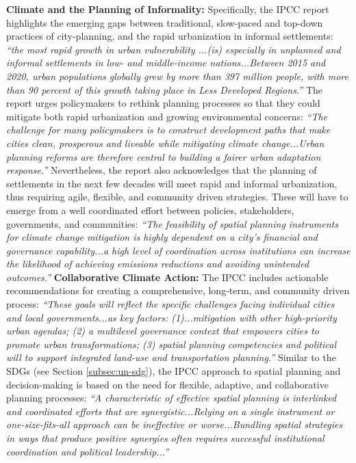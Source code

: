{{{            \textbf{Climate and the Planning of Informality:} Specifically, the IPCC report highlights the emerging gaps between traditional, slow-paced and top-down practices of city-planning, and the rapid urbanization in informal settlements: \textit{``the most rapid growth in urban vulnerability ...(is) especially in unplanned and informal settlements in low- and middle-income nations...Between 2015 and 2020, urban populations globally grew by more than 397 million people, with more than 90 percent of this growth taking place in Less Developed Regions.''}\cite{IPCC_AR6_22} The report urges policymakers to rethink planning processes so that they could mitigate both rapid urbanization and growing environmental concerns: \textit{``The challenge for many policymakers is to construct development paths that make cities clean, prosperous and liveable while mitigating climate change...Urban planning reforms are therefore central to building a fairer urban adaptation response.''}\cite{IPCC_AR6_22} Nevertheless, the report also acknowledges that the planning of settlements in the next few decades will meet rapid and informal urbanization, thus requiring agile, flexible, and community driven strategies. These will have to emerge from a well coordinated effort between policies, stakeholders, governments, and communities: \textit{``The feasibility of spatial planning instruments for climate change mitigation is highly dependent on a city's financial and governance capability...a high level of coordination across institutions can increase the likelihood of achieving emissions reductions and avoiding unintended outcomes.''} \cite{shukla2019ipcc}
            \newline
            \textbf{Collaborative Climate Action:} The IPCC includes actionable recommendations for creating a comprehensive, long-term, and community driven process: \textit{``These goals will reflect the specific challenges facing individual cities and local governments...as key factors: (1)...mitigation with other high-priority urban agendas; (2) a multilevel governance context that empowers cities to promote urban transformations; (3) spatial planning competencies and political will to support integrated land-use and transportation planning.''} Similar to the SDGs (see Section \eqref{subsec:un-sdg}), the IPCC approach to spatial planning and decision-making is based on the need for flexible, adaptive, and collaborative planning processes: \textit{``A characteristic of effective spatial planning is interlinked and coordinated efforts that are synergistic...Relying on a single instrument or one-size-fits-all approach can be ineffective or worse...Bundling spatial strategies in ways that produce positive synergies often requires successful institutional coordination and political leadership...''}
}}}
